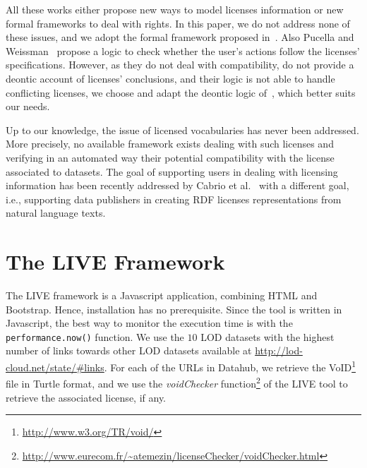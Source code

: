All these works either propose new ways to model licenses information or new formal frameworks to deal with rights. In this paper, we do not address none of these issues, and we adopt the formal framework proposed in~\cite{DBLP:conf/semweb/GovernatoriRVG13}. Also Pucella and Weissman~\cite{DBLP:conf/csfw/PucellaW02} propose a logic to check whether the user's actions follow the licenses' specifications. However, as they do not deal with compatibility, do not provide a deontic account of licenses' conclusions, and their logic is not able to handle conflicting licenses, we choose and adapt the deontic logic of~\cite{DBLP:conf/semweb/GovernatoriRVG13}, which better suits our needs.

Up to our knowledge, the issue of licensed vocabularies has never been addressed. More precisely, no available framework exists dealing with such licenses and verifying in an automated way their potential compatibility with the license associated to datasets. The goal of supporting users in dealing with licensing information has been recently addressed by Cabrio et al.~\cite{CabrioESWC2014} with a different goal, i.e., supporting data publishers in creating RDF licenses representations from natural language texts.

\section{The LIVE Framework}
\label{sec:live}
The LIVE framework is a Javascript application, combining HTML and Bootstrap. Hence, installation has no prerequisite. Since the tool is written in Javascript, the best way to monitor the execution time is with the \texttt{performance.now()} function. We use the $10$ LOD datasets with the highest number of links towards other LOD datasets available at \url{http://lod-cloud.net/state/#links}. For each of the URLs in Datahub, we retrieve the VoID\footnote{\url{http://www.w3.org/TR/void/}} file in Turtle format, and we use the \textit{voidChecker} function\footnote{\url{http://www.eurecom.fr/~atemezin/licenseChecker/voidChecker.html}} of the LIVE tool to retrieve the associated license, if any.

